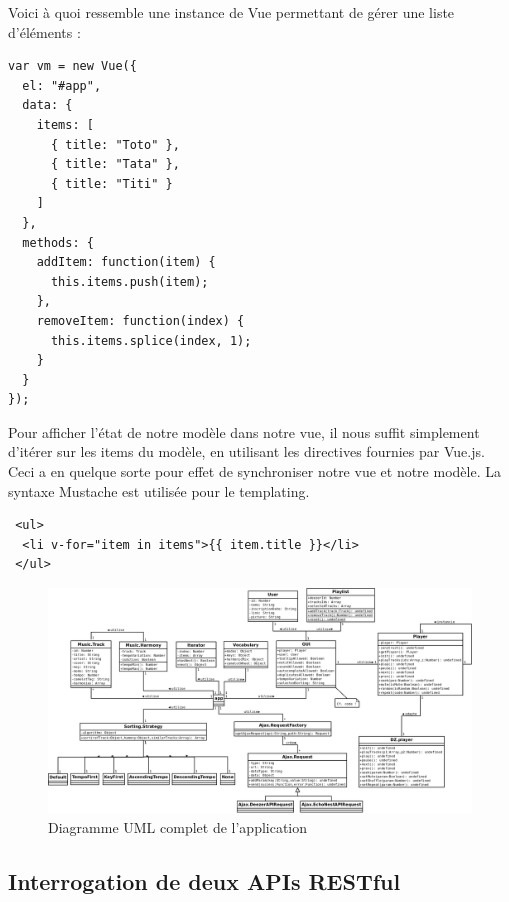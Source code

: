 \documentclass[a4paper,12pt]{article}
\begin{document}
Voici à quoi ressemble une instance de Vue permettant de gérer une liste d'éléments :

\begin{lstlisting}
var vm = new Vue({
  el: "#app",
  data: {
    items: [
      { title: "Toto" },
      { title: "Tata" },
      { title: "Titi" }
    ]
  },
  methods: {
    addItem: function(item) {
      this.items.push(item);
    },
    removeItem: function(index) {
      this.items.splice(index, 1);
    }
  }
});
\end{lstlisting}

Pour afficher l'état de notre modèle dans notre vue, il nous suffit simplement d'itérer sur les items du modèle, en utilisant les directives fournies par Vue.js. Ceci a en quelque sorte pour effet de synchroniser notre vue et notre modèle. La syntaxe Mustache est utilisée pour le templating.

\begin{lstlisting}
 <ul>
  <li v-for="item in items">{{ item.title }}</li>
 </ul>
\end{lstlisting}

\begin{landscape}
  \begin{figure}
  \begin{center}
    \includegraphics[scale=.4]{App.png}
  \end{center}
  \caption{Diagramme UML complet de l'application}
  \end{figure}
\end{landscape}

\subsection{Interrogation de deux APIs RESTful}
\end{document}
